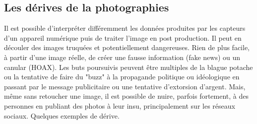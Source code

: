 \documentclass[10pt,fleqn]{article} %
\begin{document}
\subsection{Les dérives de la photographies}
Il est possible d'interpréter différemment les données produites par les capteurs d'un appareil numérique puis de traiter l'image en post production. Il peut en découler des images truquées et potentiellement dangereuses. Rien de plus facile, à partir d'une image réelle, de créer une fausse information (fake news) ou un canular (HOAX). Les buts poursuivis peuvent être multiples de la blague potache ou la tentative de faire du "buzz" à la propagande politique ou idéologique en passant par le message publicitaire ou une tentative d'extorsion d'argent.
Mais, même sans retoucher une image, il est possible de nuire, parfois fortement, à des personnes en publiant des photos à leur insu, principalement sur les réseaux sociaux.
Quelques exemples de dérive.
\end{document}
